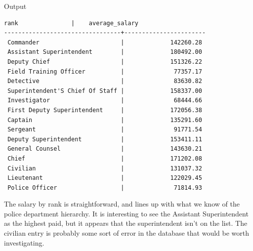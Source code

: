 \documentclass{article}
\begin{document}
\pagebreak
\begin{center}
Output
\end{center}
\begin{lstlisting}[frame=single]
              rank               |    average_salary     
---------------------------------+-----------------------
 Commander                       |             142260.28
 Assistant Superintendent        |             180492.00
 Deputy Chief                    |             151326.22
 Field Training Officer          |              77357.17
 Detective                       |              83630.82
 Superintendent'S Chief Of Staff |             158337.00
 Investigator                    |              68444.66
 First Deputy Superintendent     |             172056.38
 Captain                         |             135291.60
 Sergeant                        |              91771.54
 Deputy Superintendent           |             153411.11
 General Counsel                 |             143630.21
 Chief                           |             171202.08
 Civilian                        |             131037.32
 Lieutenant                      |             122029.45
 Police Officer                  |              71814.93
\end{lstlisting}

The salary by rank is straightforward, and lines up with what we know of the police department hierarchy. It is interesting to see the Assistant Superintendent as the highest paid, but it appears that the superintendent isn't on the list. The civilian
entry is probably some sort of error in the database that would be worth investigating.
\end{document}
